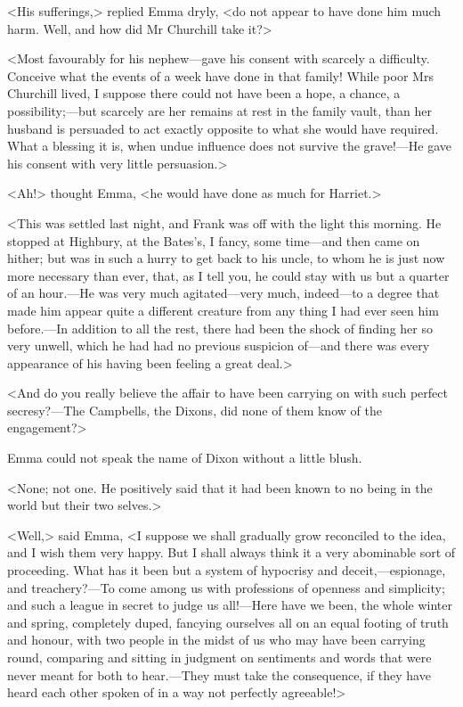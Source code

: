 <His sufferings,> replied Emma dryly, <do not appear to have done him much harm. Well, and how did Mr Churchill take it?>

<Most favourably for his nephew—gave his consent with scarcely a difficulty. Conceive what the events of a week have done in that family! While poor Mrs Churchill lived, I suppose there could not have been a hope, a chance, a possibility;—but scarcely are her remains at rest in the family vault, than her husband is persuaded to act exactly opposite to what she would have required. What a blessing it is, when undue influence does not survive the grave!—He gave his consent with very little persuasion.>

<Ah!> thought Emma, <he would have done as much for Harriet.>

<This was settled last night, and Frank was off with the light this morning. He stopped at Highbury, at the Bates's, I fancy, some time—and then came on hither; but was in such a hurry to get back to his uncle, to whom he is just now more necessary than ever, that, as I tell you, he could stay with us but a quarter of an hour.—He was very much agitated—very much, indeed—to a degree that made him appear quite a different creature from any thing I had ever seen him before.—In addition to all the rest, there had been the shock of finding her so very unwell, which he had had no previous suspicion of—and there was every appearance of his having been feeling a great deal.>

<And do you really believe the affair to have been carrying on with such perfect secresy?—The Campbells, the Dixons, did none of them know of the engagement?>

Emma could not speak the name of Dixon without a little blush.

<None; not one. He positively said that it had been known to no being in the world but their two selves.>

<Well,> said Emma, <I suppose we shall gradually grow reconciled to the idea, and I wish them very happy. But I shall always think it a very abominable sort of proceeding. What has it been but a system of hypocrisy and deceit,—espionage, and treachery?—To come among us with professions of openness and simplicity; and such a league in secret to judge us all!—Here have we been, the whole winter and spring, completely duped, fancying ourselves all on an equal footing of truth and honour, with two people in the midst of us who may have been carrying round, comparing and sitting in judgment on sentiments and words that were never meant for both to hear.—They must take the consequence, if they have heard each other spoken of in a way not perfectly agreeable!>

